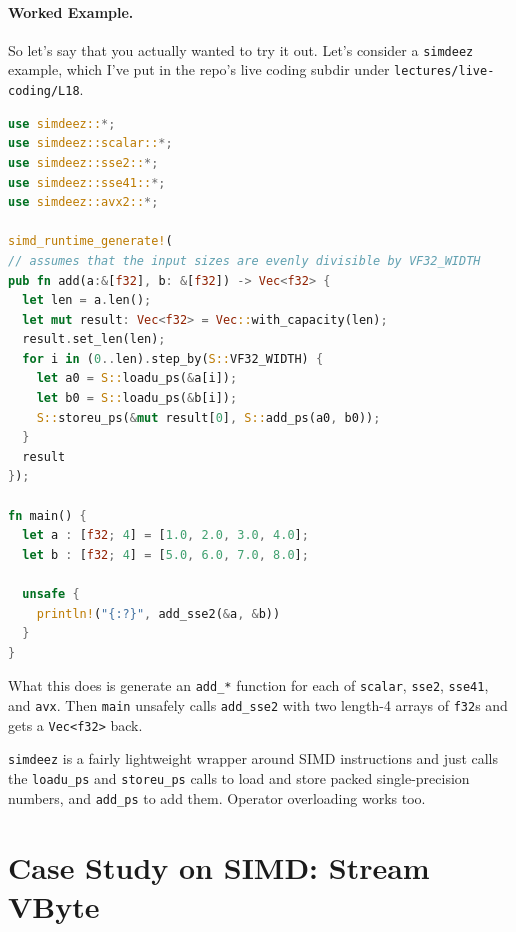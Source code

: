 \documentclass[a4paper]{report}
\begin{document}

\paragraph{Worked Example.} So let's say that you actually wanted to try it out. Let's consider a \texttt{simdeez} example, which I've put in the repo's live coding subdir under \texttt{lectures/live-coding/L18}.

\begin{lstlisting}[language=Rust]
use simdeez::*;
use simdeez::scalar::*;
use simdeez::sse2::*;
use simdeez::sse41::*;
use simdeez::avx2::*;

simd_runtime_generate!(
// assumes that the input sizes are evenly divisible by VF32_WIDTH
pub fn add(a:&[f32], b: &[f32]) -> Vec<f32> {
  let len = a.len();
  let mut result: Vec<f32> = Vec::with_capacity(len);
  result.set_len(len);
  for i in (0..len).step_by(S::VF32_WIDTH) {
    let a0 = S::loadu_ps(&a[i]);
    let b0 = S::loadu_ps(&b[i]);
    S::storeu_ps(&mut result[0], S::add_ps(a0, b0));
  }
  result
});

fn main() {
  let a : [f32; 4] = [1.0, 2.0, 3.0, 4.0];
  let b : [f32; 4] = [5.0, 6.0, 7.0, 8.0];

  unsafe {
    println!("{:?}", add_sse2(&a, &b))
  }
}
\end{lstlisting}
What this does is generate an \texttt{add\_*} function for each of \texttt{scalar},
\texttt{sse2}, \texttt{sse41}, and \texttt{avx}. Then \texttt{main}
unsafely calls \texttt{add\_sse2} with two length-4 arrays of \texttt{f32}s and
gets a \texttt{Vec<f32>} back.

\texttt{simdeez} is a fairly lightweight wrapper around SIMD instructions and just
calls the \texttt{loadu\_ps} and \texttt{storeu\_ps} calls to load and store
packed single-precision numbers, and \texttt{add\_ps} to add them. Operator overloading
works too.

\section*{Case Study on SIMD: Stream VByte }
\end{document}

